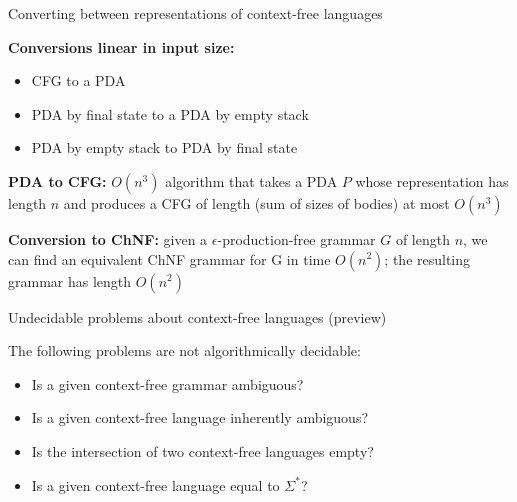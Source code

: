 \documentclass[handout]{beamer}
\begin{document}
\begin{frame}{Converting between representations of context-free languages}

    \textbf{Conversions linear in input size:}
    \begin{itemize}
        \item CFG to a PDA
        \item PDA by final state to a PDA by empty stack
        \item PDA by empty stack to PDA by final state
    \end{itemize}
    
    \textbf{PDA to CFG:} $O(n^3)$ algorithm that takes a PDA $P$ whose representation has length $n$ and produces a CFG of length (sum of sizes of bodies) at most $O(n^3)$
    
    \textbf{Conversion to ChNF:} given a $\epsilon$-production-free grammar $G$ of length $n$, we can find an equivalent ChNF grammar for G in time $O(n^2)$; the resulting grammar has length $O(n^2)$

\end{frame}


\begin{frame}{Undecidable problems about context-free languages (preview)}
    
    The following problems are not algorithmically \alert{decidable}:
    \begin{itemize}
        \item Is a given context-free grammar ambiguous?
        \item Is a given context-free language inherently ambiguous?
        \item Is the intersection of two context-free languages empty?
        \item Is a given context-free language equal to $\Sigma^*$?
    \end{itemize}

\end{frame}
\end{document}
